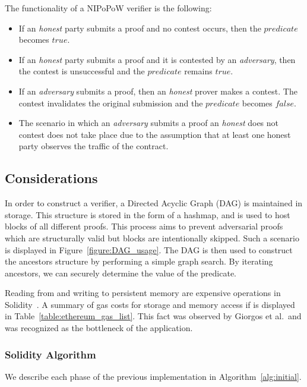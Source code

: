 The functionality of a NIPoPoW verifier is the following:
\begin{itemize}

  \item
    If an \textit{honest} party submits a proof and no contest occurs, then
    the $predicate$ becomes $true$.

  \item
    If an \textit{honest} party submits a proof and it is contested by an
    \textit{adversary}, then the contest is unsuccessful and the
    $predicate$ remains $true$.

  \item
      If an \textit{adversary} submits a proof, then an \textit{honest} prover
      makes a contest. The contest invalidates the original submission and the
      $predicate$ becomes $false$.

  \item
    The scenario in which an \textit{adversary} submits a proof an
    \textit{honest} does not contest does not take place due to the
    assumption that at least one honest party observes the traffic of the
    contract.

\end{itemize}

\subsection{Considerations}

In order to construct a verifier, a Directed Acyclic Graph (DAG) is maintained
in storage. This structure is stored in the form of a hashmap, and is used
to host blocks of all different proofs. This process aims to prevent
adversarial proofs which are structurally valid but blocks are intentionally
skipped. Such a scenario is displayed in Figure~\ref{figure:DAG_usage}. The DAG
is then used to construct the ancestors structure by performing a simple graph
search. By iterating ancestors, we can securely determine the value of the
predicate.



Reading from and writing to persistent memory are expensive operations in
Solidity~\cite{wood}. A summary of gas costs for storage and memory access if is
displayed in Table~\ref{table:ethereum_gas_list}. This fact was observed by
Giorgos et al.\ and was recognized as the bottleneck of the application.



\subsubsection{Solidity Algorithm}

We describe each phase of the previous implementation in
Algorithm~\ref{alg:initial}.


